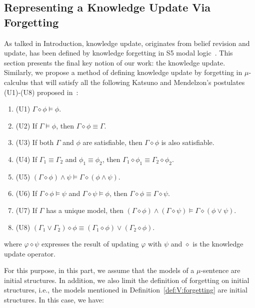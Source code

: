 \documentclass[runningheads]{llncs}
\begin{document}
\subsection{Representing a Knowledge Update Via Forgetting}\label{knowledge_updat}
As talked in Introduction, knowledge update, originates from belief revision and update, has been defined by knowledge forgetting in S5 modal logic~\cite{Zhang2009Knowledge}.
This section presents the final key notion of our work: the knowledge update.
Similarly, we propose a method of defining knowledge update by forgetting in $\mu$-calculus that will
satisfy all the following Katsuno and Mendelzon's postulates (U1)-(U8) proposed in~\cite{katsuno91mendelzon}:
\begin{enumerate}[]
    \item (U1)  $\Gamma \diamond \phi \models \phi$.
    \item (U2) If  $\Gamma \models \phi$,  then  $\Gamma \diamond \phi \equiv \Gamma$.
    \item (U3) If both $\Gamma$ and $\phi$ are satisfiable, then $\Gamma \diamond \phi$ is also satisfiable.
    \item (U4) If $\Gamma_1\equiv \Gamma_2$ and $\phi_1 \equiv \phi_2$, then $\Gamma_1 \diamond \phi_1 \equiv \Gamma_2 \diamond \phi_2$.
    \item (U5) $(\Gamma \diamond \phi) \wedge \psi \models \Gamma \diamond(\phi \wedge \psi)$.
    \item (U6) If $\Gamma \diamond \phi \models \psi$ and $\Gamma \diamond \psi \models \phi$, then $\Gamma \diamond \phi \equiv \Gamma \diamond \psi$.
    \item (U7) If $\Gamma$ has a unique model, then $(\Gamma \diamond \phi) \wedge (\Gamma \diamond \psi) \models \Gamma \diamond (\phi \vee \psi)$.
    \item (U8) $(\Gamma_1 \vee \Gamma_2) \diamond \phi \equiv (\Gamma_1 \diamond \phi) \vee  (\Gamma_2 \diamond \phi)$.
\end{enumerate}
where $\varphi \diamond \psi$ expresses the result of updating $\varphi$ with $\psi$ and $\diamond$ is the knowledge update operator.


For this purpose, in this part, we assume that the models of a $\mu$-sentence are initial structures.
In addition, we also limit the definition of forgetting on initial structures,
i.e., the models mentioned in Definition~\ref{def:V:forgetting} are initial structures. In this case, we have:
\end{document}
